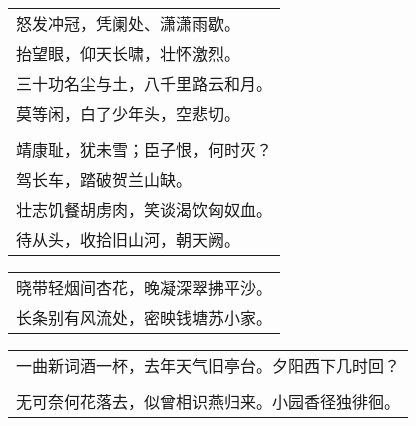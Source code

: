 \nopagebreak%
\nopagebreak%
\noindent\begin{minipage}{\linewidth}
  \vskip-3pt\begin{table}[H]
    \centering
    \begin{tabular}{@{}l@{}}
怒发冲冠，凭阑处、潇潇雨歇。\\
抬望眼，仰天长啸，壮怀激烈。\\
三十功名尘与土，八千里路云和月。\\
莫等闲，白了少年头，空悲切。\\
\\
靖康耻，犹未雪；臣子恨，何时灭？\\
驾长车，踏破贺兰山缺。\\
壮志饥餐胡虏肉，笑谈渴饮匈奴血。\\
待从头，收拾旧山河，朝天阙。
    \end{tabular}
  \end{table}
\end{minipage}
\vspace{1cm}


\nopagebreak%
\nopagebreak%
\noindent\begin{minipage}{\linewidth}
  \vskip-3pt\begin{table}[H]
    \centering
    \begin{tabular}{@{}l@{}}
晓带轻烟间杏花，晚凝深翠拂平沙。\\
长条别有风流处，密映钱塘苏小家。
    \end{tabular}
  \end{table}
\end{minipage}
\vspace{1cm}


\nopagebreak%
\nopagebreak%
\noindent\begin{minipage}{\linewidth}
  \vskip-3pt\begin{table}[H]
    \centering
    \begin{tabular}{@{}l@{}}
一曲新词酒一杯，去年天气旧亭台。夕阳西下几时回？\\
\\
无可奈何花落去，似曾相识燕归来。小园香径独徘徊。
    \end{tabular}
  \end{table}
\end{minipage}
\vspace{1cm}


